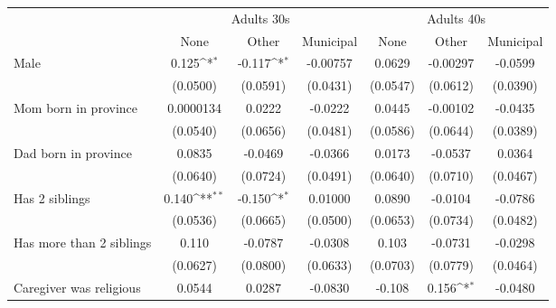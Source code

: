 {
\def\sym#1{\ifmmode^{#1}\else\(^{#1}\)\fi}
\begin{tabular}{l*{6}{c}}
\toprule
&\multicolumn{3}{c}{Adults 30s}&\multicolumn{3}{c}{Adults 40s} \\
                    &\multicolumn{1}{c}{None}&\multicolumn{1}{c}{Other}&\multicolumn{1}{c}{Municipal}&\multicolumn{1}{c}{None}&\multicolumn{1}{c}{Other}&\multicolumn{1}{c}{Municipal}\\
\midrule
Male                &       0.125\sym{*}  &      -0.117\sym{*}  &    -0.00757         &      0.0629         &    -0.00297         &     -0.0599         \\
                    &    (0.0500)         &    (0.0591)         &    (0.0431)         &    (0.0547)         &    (0.0612)         &    (0.0390)         \\
\addlinespace
Mom born in province&   0.0000134         &      0.0222         &     -0.0222         &      0.0445         &    -0.00102         &     -0.0435         \\
                    &    (0.0540)         &    (0.0656)         &    (0.0481)         &    (0.0586)         &    (0.0644)         &    (0.0389)         \\
\addlinespace
Dad born in province&      0.0835         &     -0.0469         &     -0.0366         &      0.0173         &     -0.0537         &      0.0364         \\
                    &    (0.0640)         &    (0.0724)         &    (0.0491)         &    (0.0640)         &    (0.0710)         &    (0.0467)         \\
\addlinespace
Has 2 siblings      &       0.140\sym{**} &      -0.150\sym{*}  &     0.01000         &      0.0890         &     -0.0104         &     -0.0786         \\
                    &    (0.0536)         &    (0.0665)         &    (0.0500)         &    (0.0653)         &    (0.0734)         &    (0.0482)         \\
\addlinespace
Has more than 2 siblings&       0.110         &     -0.0787         &     -0.0308         &       0.103         &     -0.0731         &     -0.0298         \\
                    &    (0.0627)         &    (0.0800)         &    (0.0633)         &    (0.0703)         &    (0.0779)         &    (0.0464)         \\
\addlinespace
Caregiver was religious&      0.0544         &      0.0287         &     -0.0830         &      -0.108         &       0.156\sym{*}  &     -0.0480         \\

\end{tabular}}
